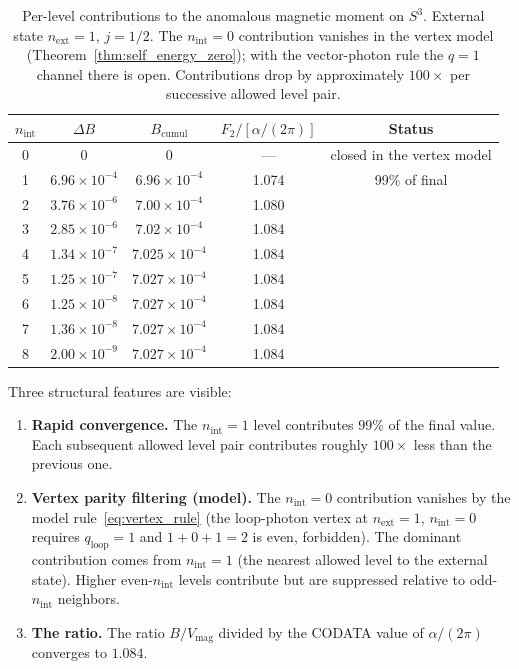 \documentclass[11pt]{article}
\begin{document}
\begin{table}[h]
\centering
\caption{Per-level contributions to the anomalous magnetic moment on
$S^3$.  External state $n_{\mathrm{ext}} = 1$, $j = 1/2$.
The $n_{\mathrm{int}} = 0$ contribution vanishes in the vertex model
(Theorem~\ref{thm:self_energy_zero}); with the vector-photon rule the
$q = 1$ channel there is open.
Contributions drop by approximately $100\times$ per successive allowed
level pair.}
\label{tab:g_minus_2}
\begin{tabular}{@{}ccccc@{}}
\toprule
$n_{\mathrm{int}}$ & $\Delta B$ & $B_{\mathrm{cumul}}$
  & $F_2 / [\alpha/(2\pi)]$ & Status \\
\midrule
0 & $0$     & $0$           & ---     & closed in the vertex model \\
1 & $6.96 \times 10^{-4}$  & $6.96 \times 10^{-4}$  & 1.074  & 99\% of final \\
2 & $3.76 \times 10^{-6}$  & $7.00 \times 10^{-4}$  & 1.080  & \\
3 & $2.85 \times 10^{-6}$  & $7.02 \times 10^{-4}$  & 1.084  & \\
4 & $1.34 \times 10^{-7}$  & $7.025 \times 10^{-4}$ & 1.084  & \\
5 & $1.25 \times 10^{-7}$  & $7.027 \times 10^{-4}$ & 1.084  & \\
6 & $1.25 \times 10^{-8}$  & $7.027 \times 10^{-4}$ & 1.084  & \\
7 & $1.36 \times 10^{-8}$  & $7.027 \times 10^{-4}$ & 1.084  & \\
8 & $2.00 \times 10^{-9}$  & $7.027 \times 10^{-4}$ & 1.084  & \\
\bottomrule
\end{tabular}
\end{table}

Three structural features are visible:
\begin{enumerate}
\item \textbf{Rapid convergence.}  The $n_{\mathrm{int}} = 1$ level
      contributes 99\% of the final value.  Each subsequent allowed level
      pair contributes roughly $100\times$ less than the previous one.
\item \textbf{Vertex parity filtering (model).}
      The $n_{\mathrm{int}} = 0$ contribution vanishes by the model
      rule~\eqref{eq:vertex_rule} (the loop-photon vertex at
      $n_{\mathrm{ext}} = 1$, $n_{\mathrm{int}} = 0$ requires
      $q_{\mathrm{loop}} = 1$ and $1 + 0 + 1 = 2$ is even, forbidden).
      The dominant contribution comes from $n_{\mathrm{int}} = 1$
      (the nearest allowed level to the external state).
      Higher even-$n_{\mathrm{int}}$ levels contribute but are
      suppressed relative to odd-$n_{\mathrm{int}}$ neighbors.
\item \textbf{The ratio.}  The ratio $B/V_{\mathrm{mag}}$ divided by
      the CODATA value of $\alpha/(2\pi)$ converges to $1.084$.
\end{enumerate}
\end{document}
